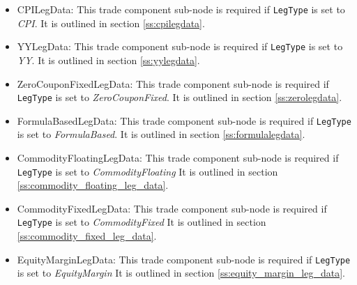 \begin{itemize}
  outlined in section \ref{ss:equitylegdata}.    
\item CPILegData: This trade component sub-node is required if \lstinline!LegType! is set to \emph{CPI}. It is
  outlined in section \ref{ss:cpilegdata}.
\item YYLegData: This trade component sub-node is required if \lstinline!LegType! is set to \emph{YY}. It is
  outlined in section \ref{ss:yylegdata}.
\item ZeroCouponFixedLegData: This trade component sub-node is required if \lstinline!LegType! is set to \emph{ZeroCouponFixed}. It is
  outlined in section \ref{ss:zerolegdata}.
  \item FormulaBasedLegData: This trade component sub-node is required if \lstinline!LegType! is set to \emph{FormulaBased}. It is
  outlined in section \ref{ss:formulalegdata}.
  \item CommodityFloatingLegData: This trade component sub-node is required if \lstinline!LegType! is set to \emph{CommodityFloating} It is
outlined in section \ref{ss:commodity_floating_leg_data}.
\item CommodityFixedLegData: This trade component sub-node is required if \lstinline!LegType! is set to \emph{CommodityFixed} It is outlined in section \ref{ss:commodity_fixed_leg_data}.
\item EquityMarginLegData: This trade component sub-node is required if \lstinline!LegType! is set to \emph{EquityMargin} It is outlined in section \ref{ss:equity_margin_leg_data}.
\end{itemize}
